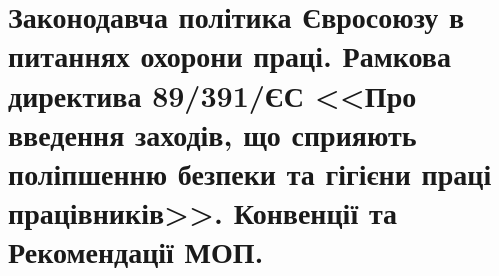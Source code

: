 






\Ukrainian

\newcommand{\khpistudentgroup}{2.КН201н.8а}
\newcommand{\khpistudentname}{Чепурний~А.~С.}

\newcommand{\khpidepartment}{Охорони праці та навколишнього середовища}
\newcommand{\khpititlewhat}{
	РЕФЕРАТ \\
	з предмету <<Законодавча політика Євросоюзу в питаннях охорони праці. Рамкова директива 89/391/ЄС <<Про введення заходів, що сприяють поліпшенню безпеки та гігієни праці працівників>>. Конвенції та Рекомендації МОП.>>
}
\newcommand{\khpititlewho}{
	Виконав: \\
	\hspace*{\parindent} ст. групи \khpistudentgroup \\
	\hspace*{\parindent} \khpistudentname \\
	Перевірила: \\
	\hspace*{\parindent} ктн, доцент каф. "ОП та НС" \\
	\hspace*{\parindent} Кузьменко~О.~О. \\
}



\addtocounter{page}{1}


\section{Законодавча політика Євросоюзу в питаннях охорони праці. Рамкова директива 89/391/ЄС <<Про введення заходів, що сприяють поліпшенню безпеки та гігієни праці працівників>>. Конвенції та Рекомендації МОП.}

